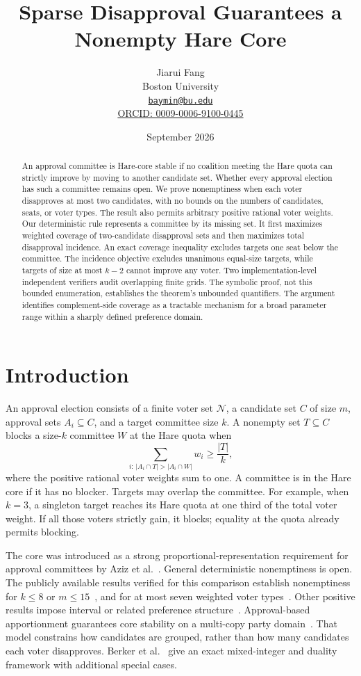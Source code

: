 \documentclass[11pt]{article}
\title{Sparse Disapproval Guarantees a Nonempty Hare Core}
\author{Jiarui Fang\\
\small Boston University\\
\small \href{mailto:baymin@bu.edu}{\texttt{baymin@bu.edu}}\\
\small \href{https://orcid.org/0009-0006-9100-0445}{ORCID: 0009-0006-9100-0445}}
\date{September 2026}
\newcommand{\N}{\mathcal N}
\begin{document}
\maketitle

\begin{abstract}
An approval committee is Hare-core stable if no coalition meeting the Hare
quota can strictly improve by moving to another candidate set.  Whether every
approval election has such a committee remains open.  We prove nonemptiness
when each voter disapproves at most two candidates, with no bounds on the
numbers of candidates, seats, or voter types.  The result also permits
arbitrary positive rational voter weights.  Our deterministic rule represents
a committee by its missing set.  It first maximizes weighted coverage of
two-candidate disapproval sets and then maximizes total disapproval incidence.
An exact coverage inequality excludes targets one seat below the committee.
The incidence objective excludes unanimous equal-size targets, while targets
of size at most $k-2$ cannot improve any voter.  Two implementation-level
independent verifiers audit overlapping finite grids.  The symbolic proof,
not this bounded
enumeration, establishes the theorem's unbounded quantifiers.  The argument
identifies complement-side coverage as a tractable mechanism for a broad
parameter range within a sharply defined preference domain.
\end{abstract}

\section{Introduction}

An approval election consists of a finite voter set $\N$, a candidate set
$C$ of size $m$, approval sets $A_i\subseteq C$, and a target committee size
$k$.  A nonempty set $T\subseteq C$ blocks a size-$k$ committee $W$ at the
Hare quota when
\[
  \sum_{i:\,|A_i\cap T|>|A_i\cap W|} w_i\ge \frac{|T|}{k},
  \tag{1}
\]
where the positive rational voter weights sum to one.  A committee is in the
Hare core if it has no blocker.  Targets may overlap the committee.  For
example, when $k=3$, a singleton target reaches its Hare quota at one third
of the total voter weight.  If all those voters strictly gain, it blocks;
equality at the quota already permits blocking.

The core was introduced as a strong proportional-representation requirement
for approval committees by Aziz et al.~\cite{aziz2017}.  General deterministic
nonemptiness is open.  The publicly available results verified for this comparison
establish nonemptiness for $k\le8$ or $m\le15$~\cite{peters2025}, and for at
most seven weighted voter types~\cite{becker2026}.  Other positive results
impose interval or related preference structure~\cite{pierczynski2022}.
Approval-based apportionment guarantees core stability on a multi-copy party
domain~\cite{brill2024}.  That model constrains how candidates are grouped,
rather than how many candidates each voter disapproves.  Berker et
al.~\cite{berker2026} give an exact mixed-integer and duality framework with
additional special cases.
\end{document}
